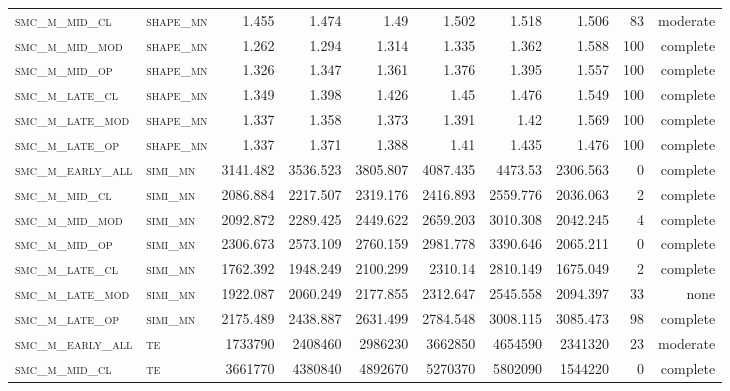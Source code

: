\begin{landscape}
\begin{center}
\begin{footnotesize}
\begin{longtable}{llrrrrr|rrr}
\textsc{smc\_m\_mid\_cl   } & \textsc{shape\_mn }   & 1.455    & 1.474    & 1.49     & 1.502    & 1.518    & 1.506    & 83  & moderate \\
\textsc{smc\_m\_mid\_mod  } & \textsc{shape\_mn }   & 1.262    & 1.294    & 1.314    & 1.335    & 1.362    & 1.588    & 100 & complete \\
\textsc{smc\_m\_mid\_op   } & \textsc{shape\_mn }   & 1.326    & 1.347    & 1.361    & 1.376    & 1.395    & 1.557    & 100 & complete \\
\textsc{smc\_m\_late\_cl  } & \textsc{shape\_mn }   & 1.349    & 1.398    & 1.426    & 1.45     & 1.476    & 1.549    & 100 & complete \\
\textsc{smc\_m\_late\_mod } & \textsc{shape\_mn }   & 1.337    & 1.358    & 1.373    & 1.391    & 1.42     & 1.569    & 100 & complete \\
\textsc{smc\_m\_late\_op  } & \textsc{shape\_mn }   & 1.337    & 1.371    & 1.388    & 1.41     & 1.435    & 1.476    & 100 & complete \\
\textsc{smc\_m\_early\_all} & \textsc{simi\_mn  }   & 3141.482 & 3536.523 & 3805.807 & 4087.435 & 4473.53  & 2306.563 & 0   & complete \\
\textsc{smc\_m\_mid\_cl   } & \textsc{simi\_mn  }   & 2086.884 & 2217.507 & 2319.176 & 2416.893 & 2559.776 & 2036.063 & 2   & complete \\
\textsc{smc\_m\_mid\_mod  } & \textsc{simi\_mn  }   & 2092.872 & 2289.425 & 2449.622 & 2659.203 & 3010.308 & 2042.245 & 4   & complete \\
\textsc{smc\_m\_mid\_op   } & \textsc{simi\_mn  }   & 2306.673 & 2573.109 & 2760.159 & 2981.778 & 3390.646 & 2065.211 & 0   & complete \\
\textsc{smc\_m\_late\_cl  } & \textsc{simi\_mn  }   & 1762.392 & 1948.249 & 2100.299 & 2310.14  & 2810.149 & 1675.049 & 2   & complete \\
\textsc{smc\_m\_late\_mod } & \textsc{simi\_mn  }   & 1922.087 & 2060.249 & 2177.855 & 2312.647 & 2545.558 & 2094.397 & 33  & none     \\
\textsc{smc\_m\_late\_op  } & \textsc{simi\_mn  }   & 2175.489 & 2438.887 & 2631.499 & 2784.548 & 3008.115 & 3085.473 & 98  & complete \\
\textsc{smc\_m\_early\_all} & \textsc{te  	    }   & 1733790  & 2408460  & 2986230  & 3662850  & 4654590  & 2341320  & 23  & moderate \\
\textsc{smc\_m\_mid\_cl   } & \textsc{te        }   & 3661770  & 4380840  & 4892670  & 5270370  & 5802090  & 1544220  & 0   & complete \\

\end{longtable}
\end{footnotesize}
\end{center}
\end{landscape}

